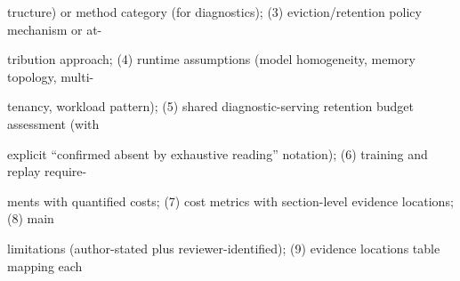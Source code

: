 \begin{flushleft}
\noindent tructure) or method category (for diagnostics); (3) eviction/retention policy mechanism or at-\par
\noindent tribution approach; (4) runtime assumptions (model homogeneity, memory topology, multi-\par
\noindent tenancy, workload pattern); (5) shared diagnostic-serving retention budget assessment (with\par
\noindent explicit “confirmed absent by exhaustive reading” notation); (6) training and replay require-\par
\noindent ments with quantified costs; (7) cost metrics with section-level evidence locations; (8) main\par
\noindent limitations (author-stated plus reviewer-identified); (9) evidence locations table mapping each\par
\end{flushleft}
